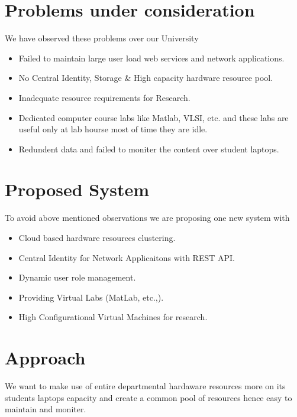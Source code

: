 \documentclass[12pt]{report}
\begin{document}
\section{Problems under consideration}

	We have observed these problems over our University
	
	\begin{itemize}
		\item Failed to maintain large user load web services  and network applications.
		\item No Central Identity, Storage \& High capacity hardware resource pool.
		\item Inadequate resource requirements for Research.
		\item Dedicated computer course labs like Matlab, VLSI, etc. and these labs are useful only at lab hourse most of time they are idle.
		\item Redundent data and failed to moniter the content over student laptops.
	\end{itemize}

\pagebreak
\section{Proposed System}

	To avoid above mentioned observations we are proposing one new system with 
	\begin{itemize}
		\item Cloud based hardware resources clustering.
		\item Central Identity for Network Applicaitons with REST API.
		\item Dynamic user role management.
		\item Providing Virtual Labs (MatLab, etc.,).
		\item High Configurational Virtual Machines for research.
	\end{itemize}
	
\section{Approach}

	We want to make use of entire departmental hardaware resources more on its students laptops capacity and create a common pool of resources hence easy to maintain and moniter.\\
	
\end{document}
